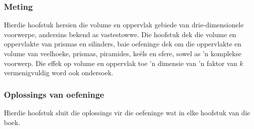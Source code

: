 \subsubsection{Meting}
Hierdie hoofstuk hersien die volume en oppervlak gebiede van drie-dimensionele voorwerpe, andersins bekend as vastestowwe. Die hoofstuk dek die volume en oppervlakte van prismas en silinders, baie oefeninge dek om die oppervlakte en volume van veelhoeke, prismas, piramides, ke\"{e}ls en sfere, sowel as 'n komplekse voorwerp. Die effek op volume en oppervlak toe 'n dimensie van 'n faktor van $k$ vermenigvuldig
word ook ondersoek.

\subsubsection{Oplossings van oefeninge}
Hierdie hoofstuk sluit die oplossings vir die oefeninge wat in elke hoofstuk van die boek.
